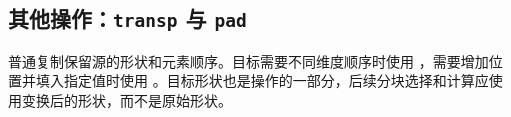 \subsection*{其他操作：\texttt{transp} 与 \texttt{pad}}

普通复制保留源的形状和元素顺序。目标需要不同维度顺序时使用 \co@transp@，需要增加位置并填入指定值时使用 \co@pad@。目标形状也是操作的一部分，后续分块选择和计算应使用变换后的形状，而不是原始形状。
